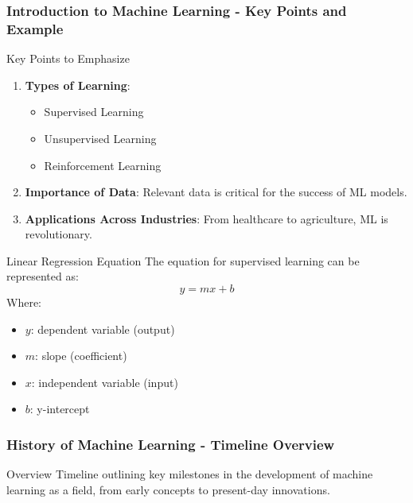\documentclass{beamer}
\begin{document}
\begin{frame}[fragile]
    \frametitle{Introduction to Machine Learning - Key Points and Example}
    \begin{block}{Key Points to Emphasize}
        \begin{enumerate}
            \item \textbf{Types of Learning}:
                \begin{itemize}
                    \item Supervised Learning
                    \item Unsupervised Learning
                    \item Reinforcement Learning
                \end{itemize}
            \item \textbf{Importance of Data}: Relevant data is critical for the success of ML models.
            \item \textbf{Applications Across Industries}: From healthcare to agriculture, ML is revolutionary.
        \end{enumerate}
    \end{block}
    \begin{block}{Linear Regression Equation}
        The equation for supervised learning can be represented as:
        \begin{equation}
            y = mx + b
        \end{equation}
        Where:  
        \begin{itemize}
            \item \( y \): dependent variable (output)  
            \item \( m \): slope (coefficient)  
            \item \( x \): independent variable (input)  
            \item \( b \): y-intercept  
        \end{itemize}
    \end{block}
\end{frame}

\begin{frame}[fragile]
    \frametitle{History of Machine Learning - Timeline Overview}
    \begin{block}{Overview}
        Timeline outlining key milestones in the development of machine learning as a field, from early concepts to present-day innovations.
    \end{block}
\end{frame}
\end{document}

